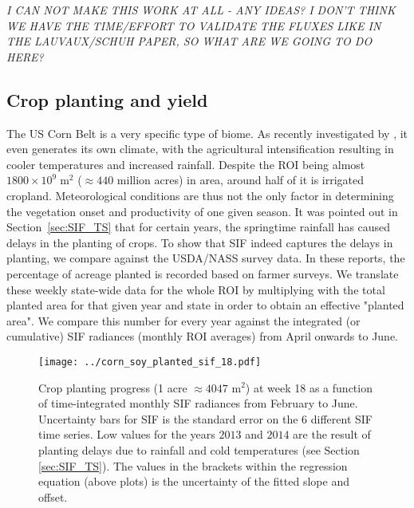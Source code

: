 \documentclass[preprint, a4paper, 10pt, times, 5p]{elsarticle}
\begin{document}
\textit{I CAN NOT MAKE THIS WORK AT ALL - ANY IDEAS? I DON'T THINK WE HAVE THE TIME/EFFORT TO VALIDATE THE FLUXES LIKE IN THE LAUVAUX/SCHUH PAPER, SO WHAT ARE WE GOING TO DO HERE?}

\subsection{Crop planting and yield}

The US Corn Belt is a very specific type of biome. As recently investigated by \citet{Alter2017}, it even generates its own climate, with the agricultural intensification resulting in cooler temperatures and increased rainfall. Despite the ROI being almost $1800 \times 10^9\;\mathrm{m}^2$ ($\approx 440$ million acres) in area, around half of it is irrigated cropland. Meteorological conditions are thus not the only factor in determining the vegetation onset and productivity of one given season. It was pointed out in Section~\ref{sec:SIF_TS} that for certain years, the springtime rainfall has caused delays in the planting of crops. To show that SIF indeed captures the delays in planting, we compare against the USDA/NASS survey data. In these reports, the percentage of acreage planted is recorded based on farmer surveys. We translate these weekly state-wide data for the whole ROI by multiplying with the total planted area for that given year and state in order to obtain an effective "planted area". We compare this number for every year against the integrated (or cumulative) SIF radiances (monthly ROI averages) from April onwards to June.

\begin{figure}[htbp]
\centering
\texttt{[image: ../corn\_soy\_planted\_sif\_18.pdf]}
\caption{Crop planting progress (1 acre $\approx 4047$ m$^2$) at week 18 as a function of time-integrated monthly SIF radiances from February to June. Uncertainty bars for SIF is the standard error on the 6 different SIF time series. Low values for the years $2013$ and $2014$ are the result of planting delays due to rainfall and cold temperatures (see Section \ref{sec:SIF_TS}). The values in the brackets within the regression equation (above plots) is the uncertainty of the fitted slope and offset.}
\label{fig:corn_soy_planted_sif}
\end{figure}
\end{document}
